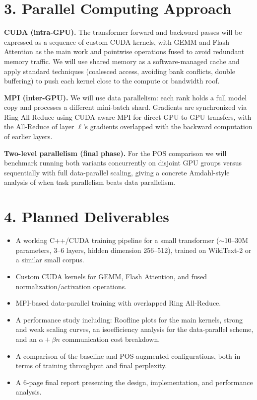\documentclass[11pt]{article}
\begin{document}
\section*{3. Parallel Computing Approach}

\textbf{CUDA (intra-GPU).} The transformer forward and backward passes will be expressed as a sequence of custom CUDA kernels, with GEMM and Flash Attention as the main work and pointwise operations fused to avoid redundant memory traffic. We will use shared memory as a software-managed cache and apply standard techniques (coalesced access, avoiding bank conflicts, double buffering) to push each kernel close to the compute or bandwidth roof.

\textbf{MPI (inter-GPU).} We will use data parallelism: each rank holds a full model copy and processes a different mini-batch shard. Gradients are synchronized via Ring All-Reduce using CUDA-aware MPI for direct GPU-to-GPU transfers, with the All-Reduce of layer $\ell$'s gradients overlapped with the backward computation of earlier layers.

\textbf{Two-level parallelism (final phase).} For the POS comparison we will benchmark running both variants concurrently on disjoint GPU groups versus sequentially with full data-parallel scaling, giving a concrete Amdahl-style analysis of when task parallelism beats data parallelism.

\section*{4. Planned Deliverables}

\begin{itemize}
    \item A working C++/CUDA training pipeline for a small transformer ($\sim$10--30M parameters, 3--6 layers, hidden dimension 256--512), trained on WikiText-2 or a similar small corpus.
    \item Custom CUDA kernels for GEMM, Flash Attention, and fused normalization/activation operations.
    \item MPI-based data-parallel training with overlapped Ring All-Reduce.
    \item A performance study including: Roofline plots for the main kernels, strong and weak scaling curves, an isoefficiency analysis for the data-parallel scheme, and an $\alpha + \beta n$ communication cost breakdown.
    \item A comparison of the baseline and POS-augmented configurations, both in terms of training throughput and final perplexity.
    \item A 6-page final report presenting the design, implementation, and performance analysis.
\end{itemize}
\end{document}
